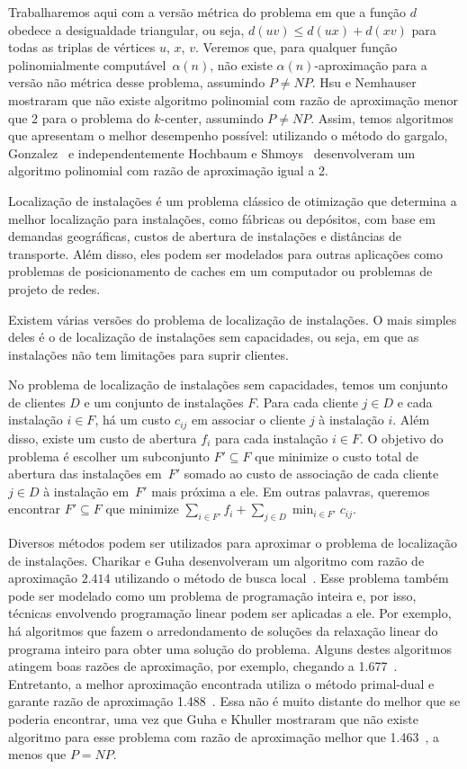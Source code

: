 \documentclass[12pt]{article}
\newcommand{\NP}{\mathit{NP}}
\begin{document}
Trabalharemos aqui com a versão métrica do problema em que a função $d$ obedece a desigualdade triangular, ou seja, $d(uv) \leq d(ux) + d(xv)$ para todas as triplas de vértices $u$, $x$, $v$. Veremos que, para qualquer função polinomialmente computável~$\alpha(n)$, não existe $\alpha(n)$-aproximação para a versão não métrica desse problema, assumindo $P\not=\NP$. Hsu e Nemhauser~\cite{HSU1979209} mostraram que não existe algoritmo polinomial com razão de aproximação menor que 2 para o problema do $k$-center, assumindo $P\not=\NP$. Assim, temos algoritmos que apresentam o melhor desempenho possível: utilizando o método do gargalo, Gonzalez~\cite{GONZALEZ1985293} e independentemente Hochbaum e Shmoys~\cite{HochShmoys'85} desenvolveram um algoritmo polinomial com razão de aproximação igual a 2. 


Localização de instalações é um problema clássico de otimização que determina a melhor localização para instalações, como fábricas ou depósitos, com base em demandas geográficas, custos de abertura de instalações e distâncias de transporte. Além disso, eles podem ser modelados para outras aplicações como problemas de posicionamento de caches em um computador ou problemas de projeto de redes.

Existem várias versões do problema de localização de instalações. O mais simples deles é o de localização de instalações sem capacidades, ou seja, em que as instalações não tem limitações para suprir clientes.

No problema de localização de instalações sem capacidades, temos um conjunto de clientes $D$ e um conjunto de instalações $F$. Para cada cliente $j \in D$ e cada instalação $i \in F$, há um custo $c_{ij}$ em associar o cliente $j$ à instalação $i$. Além disso, existe um custo de abertura $f_i$ para cada instalação $i \in F$. O objetivo do problema é escolher um subconjunto $F' \subseteq F$ que minimize o custo total de abertura das instalações em~$F'$ somado ao custo de associação de cada cliente $j \in D$ à instalação em~$F'$ mais próxima a ele. Em outras palavras, queremos encontrar $F' \subseteq F$ que minimize $\sum_{i\in F'} f_i + \sum_{j \in D} \min_{i\in F'}c_{ij}$.

Diversos métodos podem ser utilizados para aproximar o problema de localização de instalações. Charikar e Guha desenvolveram um algoritmo com razão de aproximação $2.414$ utilizando o método de busca local~\cite{Charikar&Guha'05}.  Esse problema também pode ser modelado como um problema de programação inteira e, por isso, técnicas envolvendo programação linear podem ser aplicadas a ele.  Por exemplo, há algoritmos que fazem o arredondamento de soluções da relaxação linear do programa inteiro para obter uma solução do problema.  Alguns destes algoritmos atingem boas razões de aproximação, por exemplo, chegando a 1.677~\cite{Byrka&Aardal'10}. Entretanto, a melhor aproximação encontrada utiliza o método primal-dual e garante razão de aproximação 1.488~\cite{LI'13}. Essa não é muito distante do melhor que se poderia encontrar, uma vez que Guha e Khuller mostraram que não existe algoritmo para esse problema com razão de aproximação melhor que 1.463~\cite{GUHA1999228}, a menos que $P = \NP$.
\end{document}
